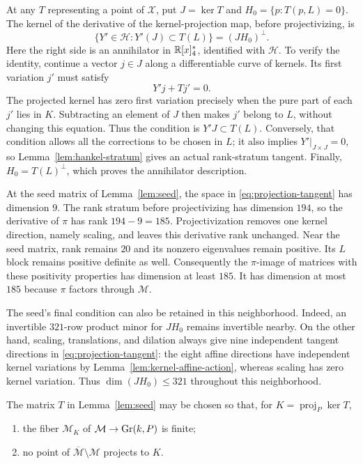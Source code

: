 At any $T$ representing a point of $\mathcal X$, put $J=\ker T$ and
$H_0=\{p:T(p,L)=0\}$. The kernel of the derivative of the
kernel-projection map, before projectivizing, is
\begin{equation}
\label{eq:projection-tangent}
 \{Y'\in\mathcal H:Y'(J)\subset T(L)\}
       =(JH_0)^\perp.
\end{equation}
Here the right side is an annihilator in $\mathbb R[x]_4^*$, identified
with $\mathcal H$. To verify the identity, continue a vector
$j\in J$ along a differentiable curve of kernels. Its first variation
$j'$ must satisfy
\[
 Y'j+Tj'=0.
\]
The projected kernel has zero first variation precisely when the
pure part of each $j'$ lies in $K$. Subtracting an element of $J$
then makes $j'$ belong to $L$, without changing this equation.
Thus the condition is $Y'J\subset T(L)$. Conversely, that condition
allows all the corrections to be chosen in $L$; it also implies
$Y'|_{J\times J}=0$, so Lemma~\ref{lem:hankel-stratum} gives an
actual rank-stratum tangent. Finally,
$H_0=T(L)^\perp$, which proves the annihilator description.

At the seed matrix of Lemma~\ref{lem:seed}, the space in
\eqref{eq:projection-tangent} has dimension $9$. The rank stratum
before projectivizing has dimension $194$, so the derivative of
$\pi$ has rank $194-9=185$. Projectivization removes one kernel
direction, namely scaling, and leaves this derivative rank unchanged.
Near the seed matrix, rank remains $20$ and its nonzero eigenvalues
remain positive. Its $L$ block remains positive definite as well.
Consequently the $\pi$-image of matrices with these positivity
properties has dimension at least $185$. It has dimension at most
$185$ because $\pi$ factors through $\mathcal M$.

The seed's final condition can also be retained in this neighborhood.
Indeed, an invertible $321$-row product minor for $JH_0$ remains
invertible nearby. On the other hand, scaling, translations, and
dilation always give nine independent tangent directions in
\eqref{eq:projection-tangent}: the eight affine directions have
independent kernel variations by Lemma~\ref{lem:kernel-affine-action},
whereas scaling has zero kernel variation. Thus $\dim(JH_0)\le321$
throughout this neighborhood.

\begin{proposition}
\label{prop:finite-normalized-fiber}
The matrix $T$ in Lemma~\ref{lem:seed} may be chosen so that, for
$K=\operatorname{proj}_P\ker T$,
\begin{enumerate}
 \item the fiber $\mathcal M_K$ of $\mathcal M\to\operatorname{Gr}(k,P)$ is finite;
 \item no point of $\overline{\mathcal M}\setminus\mathcal M$ projects
 to $K$.
\end{enumerate}
\end{proposition}

